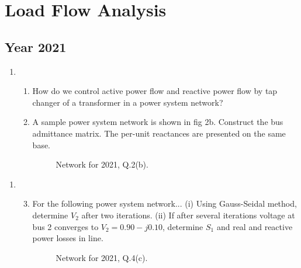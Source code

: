 \documentclass[12pt, a4paper]{article}
\begin{document}
	\section{Load Flow Analysis}
	
	\subsection{Year 2021}
	\begin{enumerate}[label=\textbf{Q\arabic*.}, wide, labelindent=0pt, start=2]
		\item
		\begin{enumerate}[label=\textbf{(\alph*)}]
			\item How do we control active power flow and reactive power flow by tap changer of a transformer in a power system network?
			\item A sample power system network is shown in fig 2b. Construct the bus admittance matrix. The per-unit reactances are presented on the same base.
			\begin{figure}[h!]
				\centering
				\caption{Network for 2021, Q.2(b).}
			\end{figure}
		\end{enumerate}
	\end{enumerate}
	
	\begin{enumerate}[label=\textbf{Q\arabic*.}, wide, labelindent=0pt, start=4]
		\item 
		\begin{enumerate}[label=\textbf{(\alph*)}]
			\setcounter{enumii}{2} %
			\item For the following power system network... (i) Using Gauss-Seidal method, determine $V_2$ after two iterations. (ii) If after several iterations voltage at bus 2 converges to $V_2 = 0.90 - j0.10$, determine $S_1$ and real and reactive power losses in line.
			\begin{figure}[h!]
				\centering
				\caption{Network for 2021, Q.4(c).}
			\end{figure}
		\end{enumerate}
	\end{enumerate}
	
\end{document}
